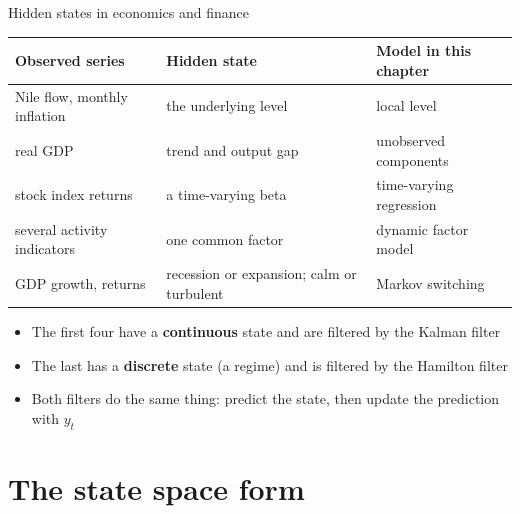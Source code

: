 \begin{frame}{Hidden states in economics and finance}
\itemsize{\small}
\begin{center}
\footnotesize
\begin{tabular}{>{\raggedright\arraybackslash}p{3.6cm}>{\raggedright\arraybackslash}p{3.6cm}>{\raggedright\arraybackslash}p{3.4cm}}
\toprule
\textbf{Observed series} & \textbf{Hidden state} & \textbf{Model in this chapter} \\
\midrule
Nile flow, monthly inflation & the underlying level & local level \\
real GDP & trend and output gap & unobserved components \\
stock index returns & a time-varying beta & time-varying regression \\
several activity indicators & one common factor & dynamic factor model \\
GDP growth, returns & recession or expansion; calm or turbulent & Markov switching \\
\bottomrule
\end{tabular}
\end{center}
\begin{itemize}
    \item The first four have a \textbf{continuous} state and are filtered by the Kalman filter
    \item The last has a \textbf{discrete} state (a regime) and is filtered by the Hamilton filter
    \item Both filters do the same thing: predict the state, then update the prediction with $y_t$
\end{itemize}
\end{frame}


\section{The state space form}

